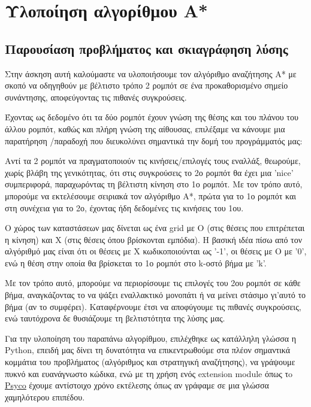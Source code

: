 \documentclass[a4paper,9pt]{article}
\begin{document}
\def\thesubsection {\arabic{subsection}}



\section*{Υλοποίηση αλγορίθμου A*} \setcounter{section}{1}

\subsection{Παρουσίαση προβλήματος και σκιαγράφηση λύσης}
Στην άσκηση αυτή καλούμαστε να υλοποιήσουμε τον αλγόριθμο αναζήτησης Α* με
σκοπό να οδηγηθούν με βέλτιστο τρόπο 2 ρομπότ σε ένα προκαθορισμένο σημείο
συνάντησης, αποφεύγοντας τις πιθανές συγκρούσεις.

Έχοντας ως δεδομένο ότι τα δύο ρομπότ έχουν γνώση της θέσης και του
πλάνου του άλλου ρομπότ, καθώς και πλήρη γνώση της αίθουσας, επιλέξαμε να
κάνουμε μια παρατήρηση /παραδοχή που διευκολύνει σημαντικά την δομή του
προγράμματός μας:

Αντί τα 2 ρομπότ να πραγματοποιούν τις κινήσεις/επιλογές τους εναλλάξ,
θεωρούμε, χωρίς βλάβη της γενικότητας, ότι στις συγκρούσεις το 2ο ρομπότ θα
έχει μια 'nice' συμπεριφορά, παραχωρόντας τη βέλτιστη κίνηση στο 1ο ρομπότ. Με
τον τρόπο αυτό, μπορούμε να εκτελέσουμε σειριακά τον αλγόριθμο A*, πρώτα για
το 1ο ρομπότ και στη συνέχεια για το 2ο, έχοντας ήδη δεδομένες τις κινήσεις
του 1ου.

Ο χώρος των καταστάσεων μας δίνεται ως ένα grid με Ο (στις θέσεις που
επιτρέπεται η κίνηση) και Χ (στις θέσεις όπου βρίσκονται εμπόδια). Η βασική
ιδέα πίσω από τον αλγόριθμό μας είναι ότι οι θέσεις με Χ κωδικοποιούνται ως
'-1', οι θέσεις με O με '0', ενώ η θέση στην οποία θα βρίσκεται το 1ο ρομπότ
στο k-οστό βήμα με 'k'.

Με τον τρόπο αυτό, μπορούμε να περιορίσουμε τις επιλογές του 2ου ρομπότ σε
κάθε βήμα, αναγκάζοντας το να ψάξει εναλλακτικό μονοπάτι ή να μείνει στάσιμο
γι'αυτό το βήμα (αν το συμφέρει). Καταφέρνουμε έτσι να αποφύγουμε τις πιθανές
συγκρούσεις, ενώ ταυτόχρονα δε θυσιάζουμε τη βελτιστότητα της λύσης μας.

Για την υλοποίηση του παραπάνω αλγορίθμου, επιλέχθηκε ως κατάλληλη γλώσσα η
Python, επειδή μας δίνει τη δυνατότητα να επικεντρωθούμε στα πλέον σημαντικά
κομμάτια του προβλήματος (αλγόριθμος και στρατηγική αναζήτησης), να γράψουμε
πυκνό και ευανάγνωστο κώδικα, ενώ με τη χρήση ενός extension module όπως
τo \underline{\href{http://psyco.sourceforge.net/}{Psyco}} έχουμε αντίστοιχο χρόνο
εκτέλεσης όπως αν γράφαμε σε μια γλώσσα χαμηλότερου επιπέδου.
\end{document}
